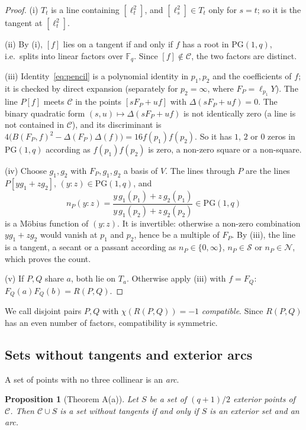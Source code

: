 \documentclass[11pt]{amsart}
\newtheorem{proposition}[theorem]{Proposition}
\theoremstyle{definition}
\theoremstyle{remark}
\numberwithin{equation}{section}
\newcommand{\F}{\mathbb{F}_q}
\newcommand{\PGone}{\mathrm{PG}(1,q)}
\newcommand{\Sq}{\mathcal{S}}
\newcommand{\Ns}{\mathcal{N}}
\newcommand{\Con}{\mathcal{C}}
\begin{document}
\begin{proof}
(i) $T_t$ is a line containing $[\ell_t^2]$, and $[\ell_s^2]\in T_t$ only for $s=t$; so it is the tangent at $[\ell_t^2]$.

(ii) By (i), $[f]$ lies on a tangent if and only if $f$ has a root in $\PGone$, i.e.\ splits into linear factors over $\F$. Since
$[f]\notin\Con$, the two factors are distinct.

(iii) Identity~\eqref{eq:pencil} is a polynomial identity in $p_1,p_2$ and the coefficients of $f$; it is checked by direct
expansion (separately for $p_2=\infty$, where $F_P=\ell_{p_1}Y$). The line $P[f]$ meets $\Con$ in the points $[sF_P+uf]$ with
$\Delta(sF_P+uf)=0$. The binary quadratic form $(s,u)\mapsto\Delta(sF_P+uf)$ is not identically zero (a line is not contained in
$\Con$), and its discriminant is $4\bigl(B(F_P,f)^2-\Delta(F_P)\Delta(f)\bigr)=16f(p_1)f(p_2)$. So it has $1$, $2$ or $0$ zeros in
$\PGone$ according as $f(p_1)f(p_2)$ is zero, a non-zero square or a non-square.

(iv) Choose $g_1,g_2$ with $F_P,g_1,g_2$ a basis of $V$. The lines through $P$ are the lines $P[yg_1+zg_2]$, $(y:z)\in\PGone$, and
\[
n_P(y:z)=\frac{y\,g_1(p_1)+z\,g_2(p_1)}{y\,g_1(p_2)+z\,g_2(p_2)}\in\PGone
\]
is a Möbius function of $(y:z)$. It is invertible: otherwise a non-zero combination $yg_1+zg_2$ would vanish at $p_1$ and $p_2$,
hence be a multiple of $F_P$. By (iii), the line is a tangent, a secant or a passant according as $n_P\in\{0,\infty\}$,
$n_P\in\Sq$ or $n_P\in\Ns$, which proves the count.

(v) If $P,Q$ share $a$, both lie on $T_a$. Otherwise apply (iii) with $f=F_Q$: $F_Q(a)F_Q(b)=R(P,Q)$.
\end{proof}

We call disjoint pairs $P,Q$ with $\chi(R(P,Q))=-1$ \emph{compatible}. Since $R(P,Q)$ has an even number of factors, compatibility
is symmetric.

\subsection{Sets without tangents and exterior arcs}
A set of points with no three collinear is an \emph{arc}.

\begin{proposition}[Theorem A(a)]\label{prop:untouchable}
Let $S$ be a set of $(q+1)/2$ exterior points of $\Con$. Then $\Con\cup S$ is a set without tangents if and only if $S$ is an
exterior set and an arc.
\end{proposition}
\end{document}
